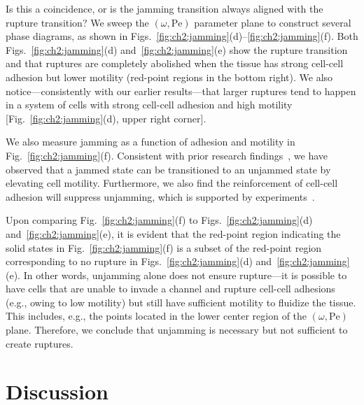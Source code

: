 Is this a coincidence, or is the jamming transition always aligned with the rupture transition?
We sweep the $(\omega, \mathrm{Pe})$ parameter plane to construct several phase diagrams, as shown in Figs.~\ref{fig:ch2:jamming}(d)--\ref{fig:ch2:jamming}(f).
Both Figs.~\ref{fig:ch2:jamming}(d) and~\ref{fig:ch2:jamming}(e) show the rupture transition and that ruptures are completely abolished when the tissue has strong cell-cell adhesion but lower motility (red-point regions in the bottom right).
We also notice---consistently with our earlier results---that larger ruptures tend to happen in a system of cells with strong cell-cell adhesion and high motility [Fig.~\ref{fig:ch2:jamming}(d), upper right corner].

We also measure jamming as a function of adhesion and motility in Fig.~\ref{fig:ch2:jamming}(f).
Consistent with prior research findings~\cite{loewe2020solid, bi2016motility}, we have observed that a jammed state can be transitioned to an unjammed state by elevating cell motility.
Furthermore, we also find the reinforcement of cell-cell adhesion will suppress unjamming, which is supported by experiments~\cite{blauth2021jamming, lin2025gradients}.

Upon comparing Fig.~\ref{fig:ch2:jamming}(f) to Figs.~\ref{fig:ch2:jamming}(d) and~\ref{fig:ch2:jamming}(e), it is evident that the red-point region indicating the solid states in Fig.~\ref{fig:ch2:jamming}(f) is a subset of the red-point region corresponding to no rupture in Figs.~\ref{fig:ch2:jamming}(d) and~\ref{fig:ch2:jamming}(e).
In other words, unjamming alone does not ensure rupture---it is possible to have cells that are unable to invade a channel and rupture cell-cell adhesions (e.g., owing to low motility) but still have sufficient motility to fluidize the tissue.
This includes, e.g., the points located in the lower center region of the $(\omega,\textrm{Pe})$ plane.
Therefore, we conclude that unjamming is necessary but not sufficient to create ruptures.


\section{Discussion}
\label{sec:ch2:discussion}

